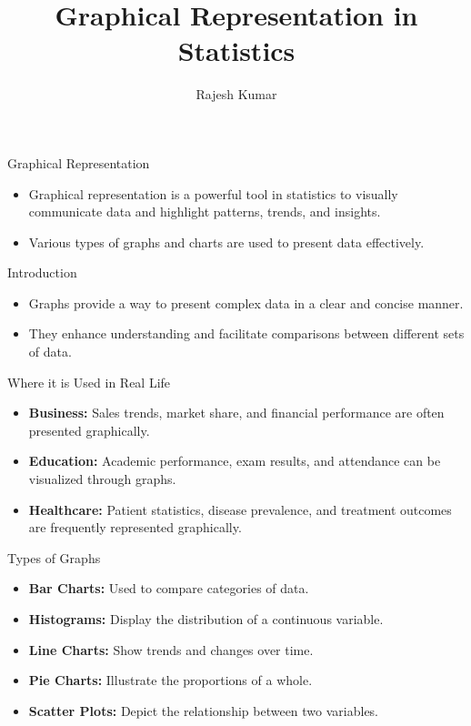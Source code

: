 
\title{Graphical Representation in Statistics}
\author{Rajesh Kumar}
\date{}

\begin{frame}
  \titlepage
\end{frame}

\begin{frame}{Graphical Representation}
  \begin{itemize}
    \item Graphical representation is a powerful tool in statistics to visually communicate data and highlight patterns, trends, and insights.
    \item Various types of graphs and charts are used to present data effectively.
  \end{itemize}
\end{frame}

\begin{frame}{Introduction}
  \begin{itemize}
    \item Graphs provide a way to present complex data in a clear and concise manner.
    \item They enhance understanding and facilitate comparisons between different sets of data.
  \end{itemize}
\end{frame}

\begin{frame}{Where it is Used in Real Life}
  \begin{itemize}
    \item \textbf{Business:} Sales trends, market share, and financial performance are often presented graphically.
    \item \textbf{Education:} Academic performance, exam results, and attendance can be visualized through graphs.
    \item \textbf{Healthcare:} Patient statistics, disease prevalence, and treatment outcomes are frequently represented graphically.
  \end{itemize}
\end{frame}

\begin{frame}{Types of Graphs}
  \begin{itemize}
    \item \textbf{Bar Charts:} Used to compare categories of data.
    \item \textbf{Histograms:} Display the distribution of a continuous variable.
    \item \textbf{Line Charts:} Show trends and changes over time.
    \item \textbf{Pie Charts:} Illustrate the proportions of a whole.
    \item \textbf{Scatter Plots:} Depict the relationship between two variables.
  \end{itemize}
\end{frame}

